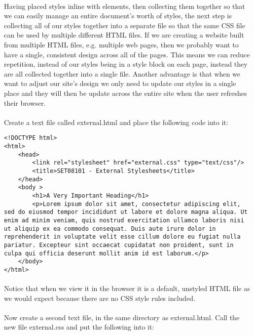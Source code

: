 \documentclass[10pt, a4paper, twosize]{article}
\begin{document}
\paragraph{} Having placed styles inline with elements, then collecting them together so that we can easily manage an entire document's worth of styles, the next step is collecting all of our styles together into a separate file so that the same CSS file can be used by multiple different HTML files. If we are creating a website built from multiple HTML files, e.g. multiple web pages, then we probably want to have a single, consistent design across all of the pages. This means we can reduce repetition, instead of our styles being in a style block on each page, instead they are all collected together into a single file. Another advantage is that when we want to adjust our site's design we only need to update our styles in a single place and they will then be update across the entire site when the user refreshes their browser.

\paragraph{} Create a text file called external.html and place the following code into it:

\begin{lstlisting}
<!DOCTYPE html>
<html>
    <head>
        <link rel="stylesheet" href="external.css" type="text/css"/>
        <title>SET08101 - External Stylesheets</title>
    </head>
    <body >
        <h1>A Very Important Heading</h1>
        <p>Lorem ipsum dolor sit amet, consectetur adipiscing elit, sed do eiusmod tempor incididunt ut labore et dolore magna aliqua. Ut enim ad minim veniam, quis nostrud exercitation ullamco laboris nisi ut aliquip ex ea commodo consequat. Duis aute irure dolor in reprehenderit in voluptate velit esse cillum dolore eu fugiat nulla pariatur. Excepteur sint occaecat cupidatat non proident, sunt in culpa qui officia deserunt mollit anim id est laborum.</p>
    </body>
</html>
\end{lstlisting}

\paragraph{} Notice that when we view it in the browser it is a default, unstyled HTML file as we would expect because there are no CSS style rules included. 

\paragraph{} Now create a second text file, in the same directory as external.html. Call the new file external.css and put the following into it:
\end{document}
